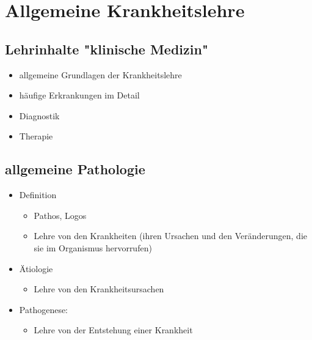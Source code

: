 \section{Allgemeine Krankheitslehre}

\subsection{Lehrinhalte "klinische Medizin"}
	\begin{itemize}
		\item allgemeine Grundlagen der Krankheitslehre
		\item häufige Erkrankungen im Detail
		\item Diagnostik
		\item Therapie
	\end{itemize}

\subsection{allgemeine Pathologie}
	\begin{itemize}
		\item Definition
			\begin{itemize}
				\item Pathos, Logos
				\item Lehre von den Krankheiten (ihren Ursachen und den  Veränderungen, die sie im Organismus hervorrufen)
			\end{itemize}
		\item Ätiologie
			\begin{itemize}
				\item Lehre von den Krankheitsursachen
			\end{itemize}
		\item Pathogenese:
			\begin{itemize}
				\item Lehre von der Entstehung einer Krankheit
			\end{itemize}
	\end{itemize}

